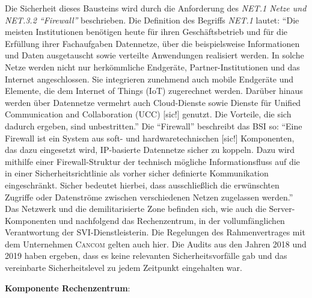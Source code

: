 Die Sicherheit dieses Bausteins wird durch die Anforderung des \textit{NET.1 Netze und NET.3.2 \enquote{Firewall}} beschrieben. Die Definition des Begriffs \textit{NET.1} lautet: \enquote{Die meisten Institutionen benötigen heute für ihren Geschäftsbetrieb und für die Erfüllung ihrer Fachaufgaben Datennetze, über die beispielsweise Informationen und Daten ausgetauscht sowie verteilte Anwendungen realisiert	werden. In solche Netze werden nicht nur herkömmliche Endgeräte, Partner-Institutionen und das Internet angeschlossen. Sie integrieren zunehmend auch mobile Endgeräte und Elemente, die dem Internet of Things (IoT) zugerechnet werden. Darüber hinaus werden über Datennetze vermehrt auch Cloud-Dienste sowie Dienste für Unified	Communication and Collaboration (UCC) [sic!] genutzt. Die Vorteile, die sich dadurch ergeben, sind unbestritten.}\autocite[][S.\,669]{bundesamt_fur_sicherheit_in_der_informationstechnik_bsi_it-grundschutz-kompendium_2020} Die \enquote{Firewall} beschreibt das \ac{BSI} so: \enquote{Eine Firewall ist ein System aus soft- und hardwaretechnischen [sic!] Komponenten, das dazu eingesetzt wird, IP-basierte Datennetze sicher zu koppeln. Dazu wird mithilfe einer Firewall-Struktur der technisch mögliche Informationsfluss auf die in einer Sicherheitsrichtlinie als vorher sicher definierte Kommunikation eingeschränkt. Sicher bedeutet hierbei, dass ausschließlich die erwünschten Zugriffe oder Datenströme zwischen verschiedenen Netzen zugelassen werden.}\autocite[][S.\,711]{bundesamt_fur_sicherheit_in_der_informationstechnik_bsi_it-grundschutz-kompendium_2020} Das Netzwerk und die demilitarisierte Zone befinden sich, wie auch die Server-Komponenten und nachfolgend das Rechenzentrum, in der vollumfänglichen Verantwortung der \ac{SVI}-Dienstleisterin. Die Regelungen des Rahmenvertrages mit dem Unternehmen \textsc{Cancom} gelten auch hier. Die Audits aus den Jahren 2018 und 2019 haben ergeben, dass es keine relevanten Sicherheitsvorfälle gab und das vereinbarte Sicherheitslevel zu jedem Zeitpunkt eingehalten war. 
\par
\textbf{Komponente Rechenzentrum}:
\par
